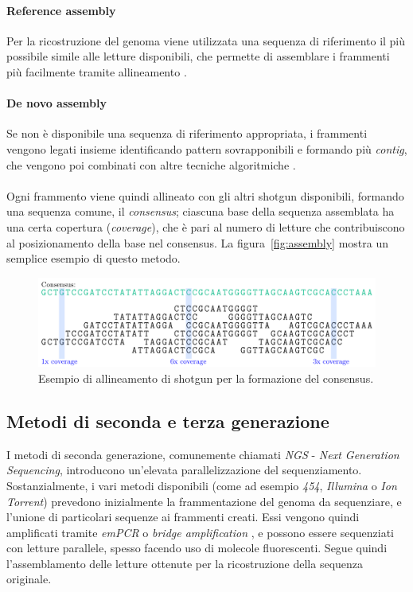 \documentclass[crop=false, class=book]{standalone}
\begin{document}
			\paragraph{Reference assembly}
			Per la ricostruzione del genoma viene utilizzata una sequenza di riferimento il più possibile simile alle letture disponibili, che permette di assemblare i frammenti più facilmente tramite allineamento \cite{wajid2014do}.
			
			\paragraph{De novo assembly}
			Se non è disponibile una sequenza di riferimento appropriata, i frammenti vengono legati insieme identificando pattern sovrapponibili e formando più \textit{contig}, che vengono poi combinati con altre tecniche algoritmiche \cite{noune2017dynamics}. 
		
		\paragraph{}
		Ogni frammento viene quindi allineato con gli altri shotgun disponibili, formando una sequenza comune, il \textit{consensus}; ciascuna base della sequenza assemblata ha una certa copertura (\textit{coverage}), che è pari al numero di letture che contribuiscono al posizionamento della base nel consensus. La figura~\vref{fig:assembly} mostra un semplice esempio di questo metodo.
		
		\begin{figure}[h]
			\centering
			\includegraphics[width=\textwidth]{capitoli/introduzione/assembly.png}
			\caption{Esempio di allineamento di shotgun per la formazione del consensus.}
			\label{fig:assembly}
		\end{figure}
		
		\subsection{Metodi di seconda e terza generazione}
		I metodi di seconda generazione, comunemente chiamati \textit{NGS} - \textit{Next Generation Sequencing}, introducono un'elevata parallelizzazione del sequenziamento. Sostanzialmente, i vari metodi disponibili (come ad esempio \textit{454}, \textit{Illumina} o \textit{Ion Torrent}) prevedono inizialmente la frammentazione del genoma da sequenziare, e l'unione di particolari sequenze ai frammenti creati. Essi vengono quindi amplificati tramite \textit{emPCR} o \textit{bridge amplification} \cite{heather2016sequence}, e possono essere sequenziati con letture parallele, spesso facendo uso di molecole fluorescenti. Segue quindi l'assemblamento delle letture ottenute per la ricostruzione della sequenza originale.
		
\end{document}
